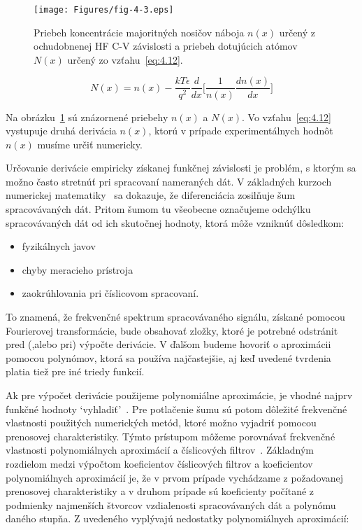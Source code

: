 \begin{figure}[h!]\centering
  \texttt{[image: Figures/fig-4-3.eps]}
  \caption[Priebeh koncentrácie majoritných nosičov náboja $n(x)$
    určený z ochudobnenej HF C-V závislosti a priebeh dotujúcich
    atómov $N(x)$ určený zo vzťahu~\ref{eq:4.12}]{Priebeh koncentrácie
    majoritných nosičov náboja $n(x)$ určený z ochudobnenej HF C-V
    závislosti a priebeh dotujúcich atómov $N(x)$ určený zo
    vzťahu~\ref{eq:4.12}.}\label{fig:4.3}
\end{figure}

\begin{equation}\label{eq:4.12}
  N(x) = n(x) - {\frac{kT\epsilon}{q^{2}} {\frac{d}{dx}} {\Bigg[\frac{1}{n(x)}\frac{dn(x)}{dx}\Bigg]}}
\end{equation}

Na obrázku~\ref{fig:4.3} sú znázornené priebehy $n(x)$ a $N(x)$. Vo
vzťahu~\ref{eq:4.12} vystupuje druhá derivácia $n(x)$, ktorú v prípade
experimentálnych hodnôt $n(x)$ musíme určiť numericky.

\par Určovanie derivácie empiricky získanej funkčnej závislosti je
problém, s ktorým sa možno často stretnúť pri spracovaní nameraných
dát. V základných kurzoch numerickej matematiky~\cite{4.19} sa
dokazuje, že diferenciácia zosilňuje šum spracovávaných dát. Pritom
šumom tu všeobecne označujeme odchýlku spracovávaných dát od ich
skutočnej hodnoty, ktorá môže vzniknúť dôsledkom:

\begin{itemize}
\item fyzikálnych javov
\item chyby meracieho prístroja
\item zaokrúhlovania pri číslicovom spracovaní.
\end{itemize}

\par To znamená, že frekvenčné spektrum spracovávaného signálu,
získané pomocou Fourierovej transformácie, bude obsahovať zložky,
ktoré je potrebné odstránit pred (,alebo pri) výpočte derivácie. V
ďalšom budeme hovoriť o aproximácii pomocou polynómov, ktorá sa
používa najčastejšie, aj keď uvedené tvrdenia platia tiež pre iné
triedy funkcií.

\par Ak pre výpočet derivácie použijeme polynomiálne aproximácie, je
vhodné najprv funkčné hodnoty `vyhladiť'~\cite{4.20}. Pre potlačenie
šumu sú potom dôležité frekvenčné vlastnosti použitých numerických
metód, ktoré možno vyjadriť pomocou prenosovej charakteristiky. Týmto
prístupom môžeme porovnávať frekvenčné vlastnosti polynomiálnych
aproximácií a číslicových filtrov~\cite{4.21}.  Základným rozdielom
medzi výpočtom koeficientov číslicových filtrov a koeficientov
polynomiálnych aproximácií je, že v prvom prípade vychádzame z
požadovanej prenosovej charakteristiky a v druhom prípade sú
koeficienty počítané z podmienky najmenších štvorcov vzdialenosti
spracovávaných dát a polynómu daného stupňa. Z uvedeného vyplývajú
nedostatky polynomiálnych aproximácií:

